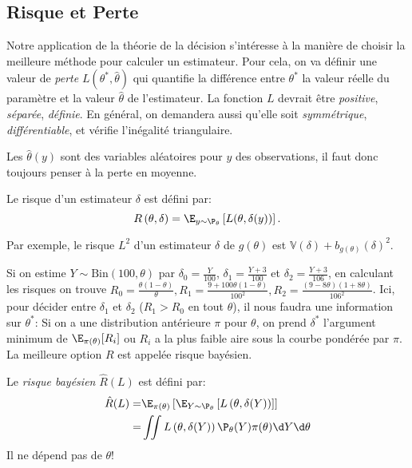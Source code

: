 \documentclass[info, math, french]{mpb-cours}
\def\tstar{\theta^{*}}
\def\that{\hat{\theta}}
\def\V{\mathbb{V}}
\def\rhat{\hat{R}}
\def\define#1{\emph{\textcolor{vulm}{#1}}}
\begin{document}
\subsection{Risque et Perte}
Notre application de la théorie de la décision s'intéresse à la manière de choisir la meilleure méthode pour calculer
un estimateur.
Pour cela, on va définir une valeur de \define{perte} $L(\tstar, \that)$ qui quantifie la différence entre $\tstar$
la valeur réelle du paramètre et la valeur $\that$ de l'estimateur.
La fonction $L$ devrait être \emph{positive}, \emph{séparée}, \emph{définie}.
En général, on demandera aussi qu'elle soit \emph{symmétrique}, \emph{différentiable}, et vérifie l'inégalité triangulaire.

\begin{remarque}
	Les $\that(y)$ sont des variables aléatoires pour $y$ des observations, il faut donc toujours penser à la perte en moyenne.
\end{remarque}

\begin{definition}
	Le risque d'un estimateur $\delta$ est défini par:
	\begin{equation*}
		R\left(\theta, \delta\right) = \E_{y\sim \P_{\theta}}\left[L(\theta, \delta(y))\right].
	\end{equation*}
\end{definition}

Par exemple, le risque $L^{2}$ d'un estimateur $\delta$ de $g\left(\theta\right)$ est $\V\left(\delta\right) + b_{g\left(\theta\right)}\left(\delta\right)^{2}$.

Si on estime $Y \sim \mathrm{Bin}(100, \theta)$ par $\delta_{0} = \frac{Y}{100}$, $\delta_{1} = \frac{Y + 3}{100}$ et $\delta_{2} = \frac{Y + 3}{106}$, en calculant les risques on trouve
$R_{0} = \frac{\theta(1 - \theta)}{\theta}, R_{1} = \frac{9 + 100\theta(1 - \theta)}{100^{2}}, R_{2} = \frac{(9 - 8\theta)(1 + 8\theta)}{106^{2}}$.
Ici, pour décider entre $\delta_{1}$ et $\delta_{2}$ ($R_{1} > R_{0}$ en tout $\theta$), il nous faudra une information sur $\theta^{*}$:
Si on a une distribution antérieure $\pi$ pour $\theta$, on prend $\delta^{*}$ l'argument minimum de $\E_{\pi(\theta)}[R_{i}]$
ou $R_{i}$ a la plus faible aire sous la courbe pondérée par $\pi$.
La meilleure option $R$ est appelée risque bayésien.

\begin{definition}
	Le \define{risque bayésien} $\rhat(L)$ est défini par:
	\begin{equation*}
		\begin{aligned}
			\rhat(L) = & \E_{\pi(\theta)}\left[\E_{Y \sim \P_{\theta}}\left[L\left(\theta, \delta(Y)\right)\right]\right] \\
			=          & \iint L\left(\theta, \delta(Y)\right)\P_{\theta}(Y)\pi(\theta)\d Y\d \theta
		\end{aligned}
	\end{equation*}
	Il ne dépend pas de $\theta$!
\end{definition}
\end{document}
